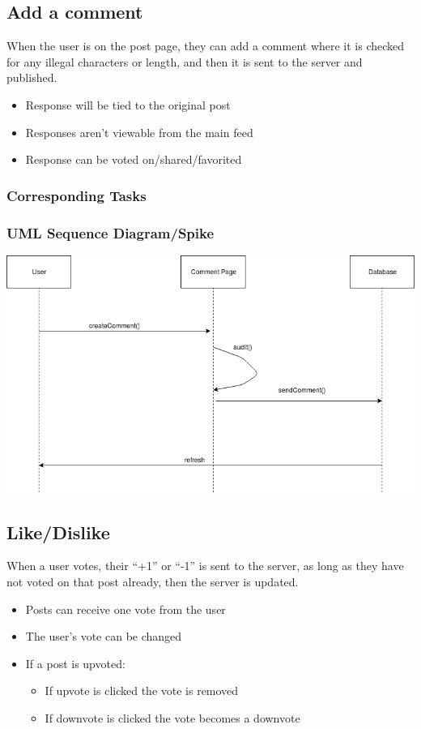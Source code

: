 \documentclass[12pt]{article}
\begin{document}
\subsection{Add a comment}
When the user is on the post page, they can add a comment where it is checked
for any illegal characters or length, and then it is sent to the server and
published.
\begin{itemize}
  \item Response will be tied to the original post
  \item Responses aren’t viewable from the main feed
  \item Response can be voted on/shared/favorited
\end{itemize}
\subsubsection{Corresponding Tasks}
\subsubsection{UML Sequence Diagram/Spike}
\includegraphics[scale=0.5]{img/story_2.png}\linebreak

\subsection{Like/Dislike}
When a user votes, their “+1” or “-1” is sent to the server, as long as they
have not voted on that post already, then the server is updated.
\begin{itemize}
  \item Posts can receive one vote from the user
  \item The user’s vote can be changed
  \item If a post is upvoted:
  \begin{itemize}
    \item If upvote is clicked the vote is removed
    \item If downvote is clicked the vote becomes a downvote
  \end{itemize}
\end{itemize}
\end{document}
